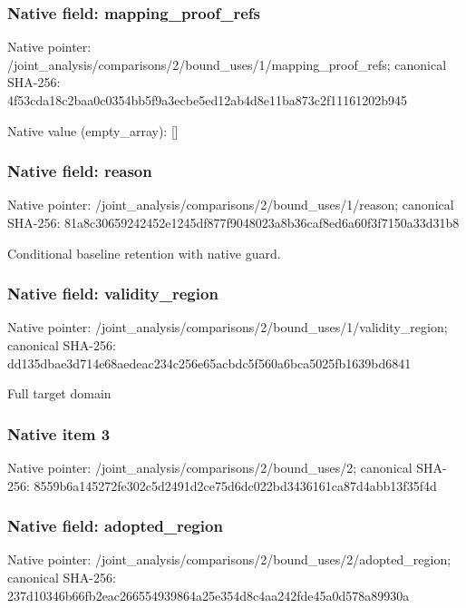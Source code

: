 \documentclass[10pt,a4paper]{article}
\begin{document}
\subsubsection{Native field: mapping\_\allowbreak{}proof\_\allowbreak{}refs}
Native pointer: /joint\_\allowbreak{}analysis/comparisons/2/bound\_\allowbreak{}uses/1/mapping\_\allowbreak{}proof\_\allowbreak{}refs; canonical SHA-256: 4f53cda18c2baa0c0354bb5f9a3ecbe5ed12ab4d8e11ba873c2f11161202b945

Native value (empty\_\allowbreak{}array): []

\subsubsection{Native field: reason}
Native pointer: /joint\_\allowbreak{}analysis/comparisons/2/bound\_\allowbreak{}uses/1/reason; canonical SHA-256: 81a8c30659242452e1245df877f9048023a8b36caf8ed6a60f3f7150a33d31b8

\begingroup\raggedright\sloppy Conditional baseline retention with native guard.\par\endgroup

\subsubsection{Native field: validity\_\allowbreak{}region}
Native pointer: /joint\_\allowbreak{}analysis/comparisons/2/bound\_\allowbreak{}uses/1/validity\_\allowbreak{}region; canonical SHA-256: dd135dbae3d714e68aedeac234c256e65acbdc5f560a6bca5025fb1639bd6841

\begingroup\raggedright\sloppy Full target domain\par\endgroup

\subsubsection{Native item 3}
Native pointer: /joint\_\allowbreak{}analysis/comparisons/2/bound\_\allowbreak{}uses/2; canonical SHA-256: 8559b6a145272fe302c5d2491d2ce75d6dc022bd3436161ca87d4abb13f35f4d

\subsubsection{Native field: adopted\_\allowbreak{}region}
Native pointer: /joint\_\allowbreak{}analysis/comparisons/2/bound\_\allowbreak{}uses/2/adopted\_\allowbreak{}region; canonical SHA-256: 237d10346b66fb2eac266554939864a25e354d8c4aa242fde45a0d578a89930a
\end{document}
